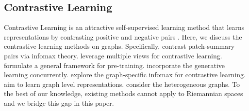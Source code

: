 \subsection{Contrastive Learning}
Contrastive Learning is an attractive self-supervised learning method that learns representations by contrasting positive and negative pairs \cite{ChenK0H20}. 
Here, we discuss the contrastive learning methods on graphs.
Specifically,
\citet{VelickovicFHLBH19} contrast patch-summary pairs via infomax theory.
\citet{HassaniA20} leverage multiple views for contrastive learning.
\citet{QiuCDZYDWT20} formulate a general framework for pre-training.
\citet{WanPY021} incorporate the generative learning concurrently.
\citet{PengHLZRXH20} explore the graph-specific infomax for contrastive learning.
\citet{pmlr-v139-xu21g} aim to learn graph level representations.
\citet{ParkK0Y20,abs-2105-09111} consider the heterogeneous graphs.
To the best of our knowledge, 
existing methods cannot apply to Riemannian spaces %
and we bridge this gap in this paper.




